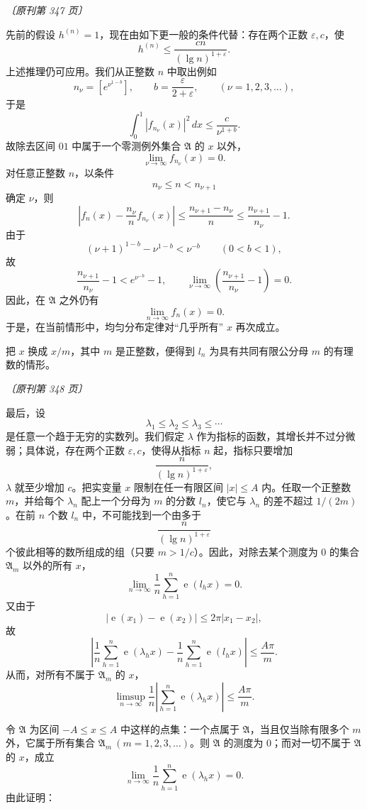 \documentclass[UTF8,11pt,a4paper,fontset=none]{ctexart}
\theoremstyle{weylthm}
\newcommand{\e}{\operatorname{e}}
\newcommand{\origpage}[1]{%
  \par\vspace{0.7em}\noindent\hfill{\small\itshape〔原刊第 #1 页〕}\par\vspace{0.25em}}
\begin{document}
\origpage{347}

先前的假设 \(h^{(n)}=1\)，现在由如下更一般的条件代替：存在两个正数
\(\varepsilon,c\)，使
\[
  h^{(n)}\leq\frac{cn}{(\lg n)^{1+\varepsilon}}.
\]
上述推理仍可应用。我们从正整数 \(n\) 中取出例如
\[
  n_\nu=\left[e^{\nu^{1-b}}\right],
  \qquad
  b=\frac{\varepsilon}{2+\varepsilon},
  \qquad(\nu=1,2,3,\ldots),
\]
于是
\[
  \int_0^1|f_{n_\nu}(x)|^2\,dx
  \leq\frac{c}{\nu^{1+b}}.
\]
故除去区间 \(01\) 中属于一个零测例外集合 \(\mathfrak A\) 的 \(x\) 以外，
\[
  \lim_{\nu\to\infty}f_{n_\nu}(x)=0.
\]
对任意正整数 \(n\)，以条件
\[
  n_\nu\leq n<n_{\nu+1}
\]
确定 \(\nu\)，则
\[
  \left|f_n(x)-\frac{n_\nu}{n}f_{n_\nu}(x)\right|
  \leq\frac{n_{\nu+1}-n_\nu}{n}
  \leq\frac{n_{\nu+1}}{n_\nu}-1.
\]
由于
\[
  (\nu+1)^{1-b}-\nu^{1-b}<\nu^{-b}
  \qquad(0<b<1),
\]
故
\[
  \frac{n_{\nu+1}}{n_\nu}-1<e^{\nu^{-b}}-1,
  \qquad
  \lim_{\nu\to\infty}\left(\frac{n_{\nu+1}}{n_\nu}-1\right)=0.
\]
因此，在 \(\mathfrak A\) 之外仍有
\[
  \lim_{n\to\infty}f_n(x)=0.
\]
于是，在当前情形中，均匀分布定律对“几乎所有” \(x\) 再次成立。

把 \(x\) 换成 \(x/m\)，其中 \(m\) 是正整数，便得到 \(l_n\) 为具有共同有限公分母 \(m\) 的有理数的情形。

\origpage{348}

最后，设
\[
  \lambda_1\leq\lambda_2\leq\lambda_3\leq\cdots
\]
是任意一个趋于无穷的实数列。我们假定 \(\lambda\) 作为指标的函数，其增长并不过分微弱；具体说，存在两个正数 \(\varepsilon,c\)，使得从指标 \(n\) 起，指标只要增加
\[
  \frac{n}{(\lg n)^{1+\varepsilon}},
\]
\(\lambda\) 就至少增加 \(c\)。把实变量 \(x\) 限制在任一有限区间
\(|x|\leq A\) 内。任取一个正整数 \(m\)，并给每个 \(\lambda_n\) 配上一个分母为
\(m\) 的分数 \(l_n\)，使它与 \(\lambda_n\) 的差不超过 \(1/(2m)\)。在前
\(n\) 个数 \(l_n\) 中，不可能找到一个由多于
\[
  \frac{n}{(\lg n)^{1+\varepsilon}}
\]
个彼此相等的数所组成的组（只要 \(m>1/c\)）。因此，对除去某个测度为 \(0\) 的集合
\(\mathfrak A_m\) 以外的所有 \(x\)，
\[
  \lim_{n\to\infty}\frac1n\sum_{h=1}^{n}\e(l_hx)=0.
\]
又由于
\[
  |\e(x_1)-\e(x_2)|\leq2\pi|x_1-x_2|,
\]
故
\[
  \left|
    \frac1n\sum_{h=1}^{n}\e(\lambda_hx)
    -\frac1n\sum_{h=1}^{n}\e(l_hx)
  \right|
  \leq\frac{A\pi}{m}.
\]
从而，对所有不属于 \(\mathfrak A_m\) 的 \(x\)，
\[
  \limsup_{n\to\infty}
  \frac1n\left|\sum_{h=1}^{n}\e(\lambda_hx)\right|
  \leq\frac{A\pi}{m}.
\]

令 \(\mathfrak A\) 为区间 \(-A\leq x\leq A\) 中这样的点集：一个点属于
\(\mathfrak A\)，当且仅当除有限多个 \(m\) 外，它属于所有集合
\(\mathfrak A_m\ (m=1,2,3,\ldots)\)。则 \(\mathfrak A\) 的测度为
\(0\)；而对一切不属于 \(\mathfrak A\) 的 \(x\)，成立
\[
  \lim_{n\to\infty}\frac1n\sum_{h=1}^{n}\e(\lambda_hx)=0.
\]
由此证明：
\end{document}
